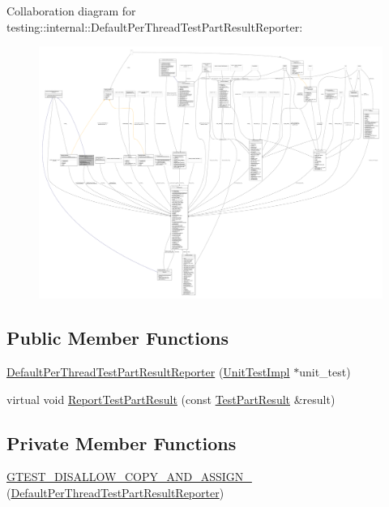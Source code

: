 Collaboration diagram for testing\+:\+:internal\+:\+:Default\+Per\+Thread\+Test\+Part\+Result\+Reporter\+:
\nopagebreak
\begin{figure}[H]
\begin{center}
\leavevmode
\includegraphics[width=350pt]{classtesting_1_1internal_1_1DefaultPerThreadTestPartResultReporter__coll__graph}
\end{center}
\end{figure}
\subsection*{Public Member Functions}
\begin{DoxyCompactItemize}
\item 
\hyperlink{classtesting_1_1internal_1_1DefaultPerThreadTestPartResultReporter_a968a846e5a90d2ffea8b2ce2746099bd}{Default\+Per\+Thread\+Test\+Part\+Result\+Reporter} (\hyperlink{classtesting_1_1internal_1_1UnitTestImpl}{Unit\+Test\+Impl} $\ast$unit\+\_\+test)
\item 
virtual void \hyperlink{classtesting_1_1internal_1_1DefaultPerThreadTestPartResultReporter_ac6dc08eadc4e5a2a64a91d0b6c6b3aad}{Report\+Test\+Part\+Result} (const \hyperlink{classtesting_1_1TestPartResult}{Test\+Part\+Result} \&result)
\end{DoxyCompactItemize}
\subsection*{Private Member Functions}
\begin{DoxyCompactItemize}
\item 
\hyperlink{classtesting_1_1internal_1_1DefaultPerThreadTestPartResultReporter_a2fe14f3349de63daee187dff7a431cd8}{G\+T\+E\+S\+T\+\_\+\+D\+I\+S\+A\+L\+L\+O\+W\+\_\+\+C\+O\+P\+Y\+\_\+\+A\+N\+D\+\_\+\+A\+S\+S\+I\+G\+N\+\_\+} (\hyperlink{classtesting_1_1internal_1_1DefaultPerThreadTestPartResultReporter}{Default\+Per\+Thread\+Test\+Part\+Result\+Reporter})
\end{DoxyCompactItemize}
